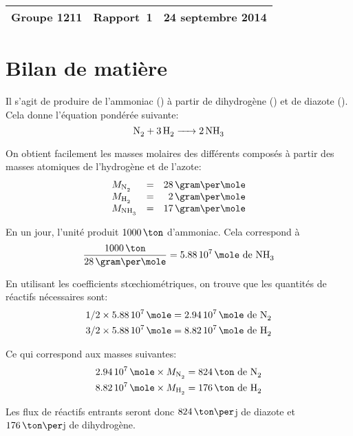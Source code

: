 \documentclass[a4paper,12pt]{article}
\begin{document}
\begin{center}
\begin{tabu} to \textwidth {lX[c]r}
    Groupe 1211 & \large{\textbf{Rapport~1}} & 24 septembre 2014 \\
    \hline
\end{tabu}
\end{center}

\section{Bilan de matière}

Il s'agit de produire de l'ammoniac () à partir de dihydrogène ()
et de diazote ().
Cela donne l'équation pondérée suivante:
\[\ce{N2 + 3H2 -> 2NH3}\]

On obtient facilement les masses molaires des différents composés à partir
des masses atomiques de l'hydrogène et de l'azote:
\[
    \begin{array}{lcr}
        M_{\ce{N2}} &=& 28\,\gram\per\mole\\
        M_{\ce{H2}} &=& 2\,\gram\per\mole\\
        M_{\ce{NH3}} &=& 17\,\gram\per\mole\\
    \end{array}
\]

En un jour, l'unité produit $1000\,\ton$ d'ammoniac.
Cela correspond à
\[
    \frac{1000\,\ton}{28\,\gram\per\mole} = 5.88\,10^7\,\mole\mbox{ de \ce{NH3}}
\]

En utilisant les coefficients stœchiométriques, on trouve que les quantités de
réactifs nécessaires sont:
\begin{align*}
    1/2 \times 5.88\,10^7\,\mole &= 2.94\,10^7\,\mole \mbox{ de \ce{N2}} \\
    3/2 \times 5.88\,10^7\,\mole &= 8.82\,10^7\,\mole \mbox{ de \ce{H2}} \\
\end{align*}

Ce qui correspond aux masses suivantes:
\begin{align*}
    2.94\,10^7\,\mole \times M_{\ce{N2}} &= 824\,\ton \mbox{ de \ce{N2}} \\
    8.82\,10^7\,\mole \times M_{\ce{H2}} &= 176\,\ton \mbox{ de \ce{H2}} \\
\end{align*}

Les flux de réactifs entrants seront donc $824\,\ton\per$j de diazote
et $176\,\ton\per$j de dihydrogène.
\end{document}
